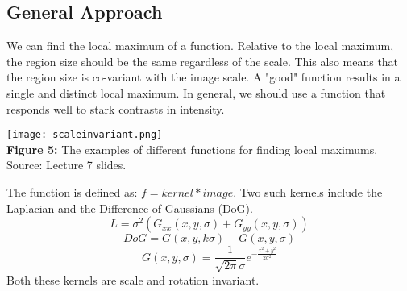 \documentclass{article}
\begin{document}
\subsection{General Approach}
We can find the local maximum of a function. Relative to the local maximum, the region size should be the same regardless of the scale. This also means that the region size is co-variant with the image scale. A "good" function results in a single and distinct local maximum. In general, we should use a function that responds well to stark contrasts in intensity. \\
\begin{center}
	\texttt{[image: scaleinvariant.png]}\\
    \textbf{Figure 5:} The examples of different functions for finding local maximums. Source: Lecture 7 slides.
\end{center}
The function is defined as: $f = kernel*image$. Two such kernels include the Laplacian and the Difference of Gaussians (DoG). $$L = \sigma^2(G_{xx}(x,y,\sigma)+G_{yy}(x,y,\sigma))$$ $$DoG = G(x,y,k\sigma) - G(x,y,\sigma)$$ $$G(x,y,\sigma) = \frac{1}{\sqrt{2\pi}\sigma}e^{-\frac{x^2+y^2}{2\sigma^2}}$$
Both these kernels are scale and rotation invariant.




\small


\end{document}
